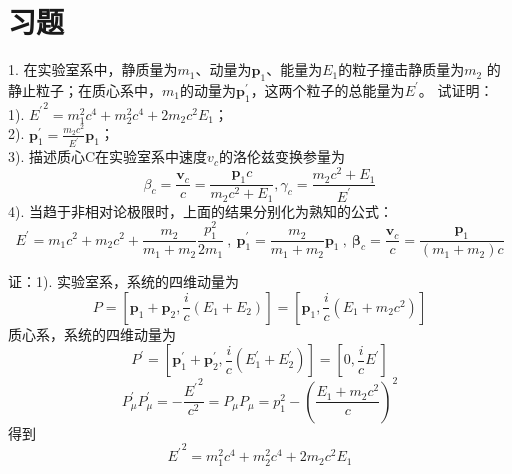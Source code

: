 \documentclass[11pt,a4paper]{article}
\renewcommand{\vec}[1]{\boldsymbol{#1}}
\begin{document}
\section{习题}
1. 在实验室系中，静质量为$m_1$、动量为$\vec{p}_1$、能量为$E_1$的粒子撞击静质量为$m_2$ 的静止粒子；在质心系中，$m_1$的动量为$\vec{p}^{\prime}_1$，这两个粒子的总能量为$E^{\prime}$。 试证明：\\
1). ${E^{\prime}}^2 = m_1^2 c^4 + m_2^2 c^4 +2m_2 c^2 E_1$；\\
2). $\vec{p}^{\prime}_1 = \frac{m_2 c^2}{E^{\prime}} \vec{p}_1$；\\
3). 描述质心C在实验室系中速度$v_c$的洛伦兹变换参量为
\begin{equation*}
\beta_c = \frac{\vec{v}_c}{c} = \frac{\vec{p}_1c }{m_2 c^2 +E_1}, \gamma_c = \frac{m_2 c^2 +E_1}{E^{\prime}}
\end{equation*}
4). 当趋于非相对论极限时，上面的结果分别化为熟知的公式：
\begin{equation*}
E^{\prime} = m_1 c^2 +m_2 c^2 +\frac{m_2}{m_1 +m_2} \frac{p_1^2}{2m_1} ~,~ \vec{p}^{\prime}_1 = \frac{m_2}{m_1 +m_2} \vec{p}_1 ~,~ \vec{\beta}_c = \frac{\vec{v}_c}{c} = \frac{\vec{p}_1}{(m_1 +m_2) c}
\end{equation*}

证：1). 实验室系，系统的四维动量为
\begin{equation*}
P = \left[\vec{p}_1 +\vec{p}_2, \frac{i}{c} (E_1 +E_2) \right] = \left[\vec{p}_1, \frac{i}{c} (E_1 +m_2 c^2) \right]
\end{equation*}
质心系，系统的四维动量为
\begin{equation*}
P^{\prime} = \left[\vec{p}^{\prime}_1 +\vec{p}^{\prime}_2, \frac{i}{c} (E^{\prime}_1 +E^{\prime}_2) \right] = \left[ 0, \frac{i}{c} E^{\prime} \right]
\end{equation*}
\begin{equation*}
P^{\prime}_{\mu} P^{\prime}_{\mu} = -\frac{{E^{\prime}}^2}{c^2} = P_{\mu} P_{\mu} = p_1^2 - \left(\frac{E_1 +m_2 c^2}{c} \right)^2
\end{equation*}
得到
\begin{equation*}
{E^{\prime}}^2 = m_1^2 c^4 + m_2^2 c^4 +2m_2 c^2 E_1
\end{equation*}
\end{document}
